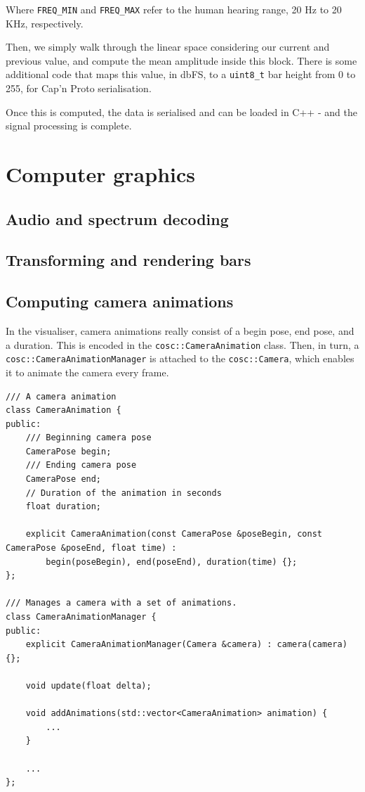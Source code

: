 \documentclass[11pt]{article}
\begin{document}
Where \verb|FREQ_MIN| and \verb|FREQ_MAX| refer to the human hearing range, 20 Hz to 20 KHz, respectively.

Then, we simply walk through the linear space considering our current and previous value, and compute the mean
amplitude inside this block. There is some additional code that maps this value, in dbFS, to a \verb|uint8_t|
bar height from 0 to 255, for Cap'n Proto serialisation.

Once this is computed, the data is serialised and can be loaded in C++ - and the signal processing is
complete.

\section{Computer graphics}
\subsection{Audio and spectrum decoding}

\subsection{Transforming and rendering bars}

\subsection{Computing camera animations}
In the visualiser, camera animations really consist of a begin pose, end pose, and a duration. This is
encoded in the \verb|cosc::CameraAnimation| class. Then, in turn, a
\verb|cosc::CameraAnimationManager| is attached to the \verb|cosc::Camera|, which enables it to animate the
camera every frame.

\begin{verbatim}
/// A camera animation
class CameraAnimation {
public:
    /// Beginning camera pose
    CameraPose begin;
    /// Ending camera pose
    CameraPose end;
    // Duration of the animation in seconds
    float duration;

    explicit CameraAnimation(const CameraPose &poseBegin, const CameraPose &poseEnd, float time) :
        begin(poseBegin), end(poseEnd), duration(time) {};
};

/// Manages a camera with a set of animations.
class CameraAnimationManager {
public:
    explicit CameraAnimationManager(Camera &camera) : camera(camera) {};

    void update(float delta);

    void addAnimations(std::vector<CameraAnimation> animation) {
        ...
    }

    ...
};
\end{verbatim}
\end{document}
